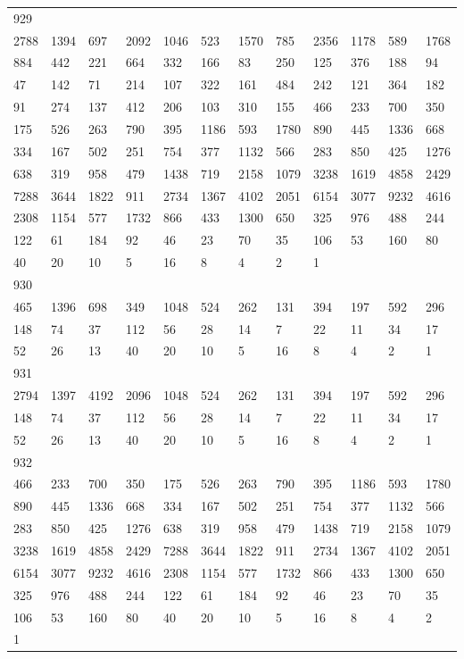 \begin{longtable}{llllllllllll}
929&&&&&&&&&&&\\
2788& 1394& 697& 2092& 1046& 523& 1570& 785& 2356& 1178& 589& 1768\\
884& 442& 221& 664& 332& 166& 83& 250& 125& 376& 188& 94\\
47& 142& 71& 214& 107& 322& 161& 484& 242& 121& 364& 182\\
91& 274& 137& 412& 206& 103& 310& 155& 466& 233& 700& 350\\
175& 526& 263& 790& 395& 1186& 593& 1780& 890& 445& 1336& 668\\
334& 167& 502& 251& 754& 377& 1132& 566& 283& 850& 425& 1276\\
638& 319& 958& 479& 1438& 719& 2158& 1079& 3238& 1619& 4858& 2429\\
7288& 3644& 1822& 911& 2734& 1367& 4102& 2051& 6154& 3077& 9232& 4616\\
2308& 1154& 577& 1732& 866& 433& 1300& 650& 325& 976& 488& 244\\
122& 61& 184& 92& 46& 23& 70& 35& 106& 53& 160& 80\\
40& 20& 10& 5& 16& 8& 4& 2& 1& \\

930&&&&&&&&&&&\\
465& 1396& 698& 349& 1048& 524& 262& 131& 394& 197& 592& 296\\
148& 74& 37& 112& 56& 28& 14& 7& 22& 11& 34& 17\\
52& 26& 13& 40& 20& 10& 5& 16& 8& 4& 2& 1\\

931&&&&&&&&&&&\\
2794& 1397& 4192& 2096& 1048& 524& 262& 131& 394& 197& 592& 296\\
148& 74& 37& 112& 56& 28& 14& 7& 22& 11& 34& 17\\
52& 26& 13& 40& 20& 10& 5& 16& 8& 4& 2& 1\\

932&&&&&&&&&&&\\
466& 233& 700& 350& 175& 526& 263& 790& 395& 1186& 593& 1780\\
890& 445& 1336& 668& 334& 167& 502& 251& 754& 377& 1132& 566\\
283& 850& 425& 1276& 638& 319& 958& 479& 1438& 719& 2158& 1079\\
3238& 1619& 4858& 2429& 7288& 3644& 1822& 911& 2734& 1367& 4102& 2051\\
6154& 3077& 9232& 4616& 2308& 1154& 577& 1732& 866& 433& 1300& 650\\
325& 976& 488& 244& 122& 61& 184& 92& 46& 23& 70& 35\\
106& 53& 160& 80& 40& 20& 10& 5& 16& 8& 4& 2\\
1& \\


\end{longtable}
